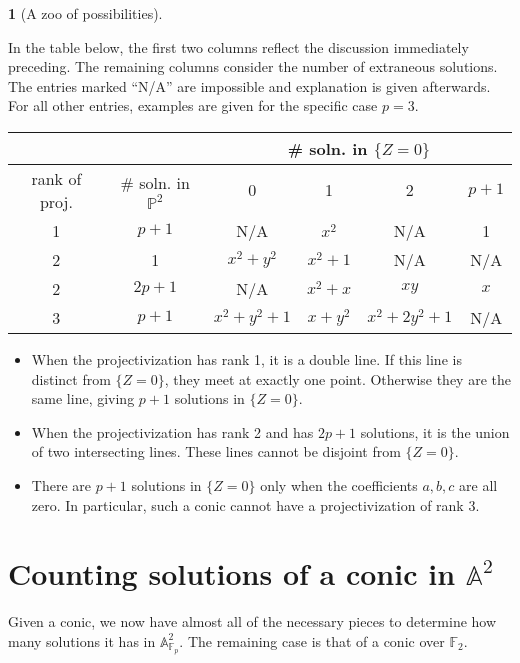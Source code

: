 \documentclass[10pt,a4paper]{amsart}
\numberwithin{equation}{section}
\numberwithin{figure}{section}
\theoremstyle{definition}
\newtheorem{example}{\protect\examplename}[section]
\theoremstyle{remark}
\theoremstyle{plain}
\theoremstyle{plain}
\theoremstyle{definition}
\theoremstyle{plain}
\theoremstyle{plain}
\providecommand{\examplename}{Example}
\newcommand{\A}{\mathbb{A}}
\newcommand{\F}{\mathbb{F}}
\begin{document}
	\begin{example}[A zoo of possibilities]
		\label{exa:all-possibilities}
		
		In the table below, the first two columns reflect the discussion
		immediately preceding. The remaining columns consider the number of extraneous
		solutions. The entries marked ``N/A'' are impossible and explanation is given
		afterwards. For all other entries, examples are given for the specific case
		$p=3$.  
		\begin{center} %
			\begin{tabular}{|c|c||c|c|c|c|} \hline \multicolumn{2}{|c||}{} &
				\multicolumn{4}{c|}{\# soln. in $\{Z=0\}$}  \\ \hline rank of proj. & \# soln.
				in $\mathbb{P}^2$ & 0 & 1 & 2 & $p + 1$\\ \hline \hline 1 & $p+1$ & N/A & $x^2$
				& N/A & 1 \\ \hline 2 & 1 & $x^2 + y^2$ & $x^2 + 1$ & N/A & N/A \\ \hline 2 &
				$2p+1$ & N/A & $x^2 + x$ & $xy$ & $x$ \\ \hline 3 & $p+1$ & $x^2 + y^2 + 1$ &
				$x+y^2$ & $x^2 + 2y^2 + 1$ & N/A \\ \hline \end{tabular}
		\end{center} 
		\begin{itemize}
			\item When the projectivization has rank 1, it is a double line. If this
			line is distinct from $\{Z = 0\}$, they meet at exactly one point. 
			Otherwise they are the same line, giving $p+1$ solutions in $\{Z=0\}$. 
			\item When the projectivization has rank 2 and has $2p + 1$ solutions, it
			is the union of two intersecting lines. These lines cannot be disjoint 
			from $\{Z=0\}$.
			\item There are $p+1$ solutions in $\{Z = 0\}$ only when the 
			coefficients $a,b,c$ are all zero. In particular, such a conic cannot 
			have a projectivization of rank 3.
		\end{itemize} 
	\end{example}

    \section{Counting solutions of a conic in $\A^2$}
    \label{sec:affine-solutions}

    Given a conic, we now have almost all of the necessary pieces to determine how
    many solutions it has in $\A^2_{\F_p}$. The remaining case is that of a
    conic over $\F_2$.
\end{document}
